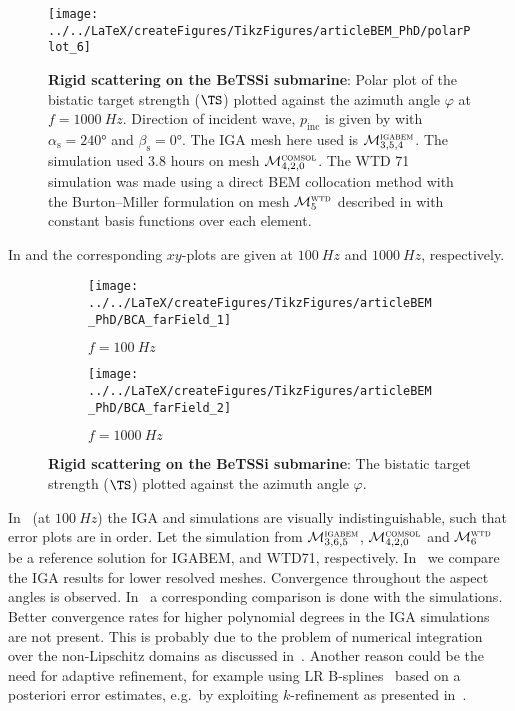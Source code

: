 \begin{figure}
	\centering
	\texttt{[image: ../../LaTeX/createFigures/TikzFigures/articleBEM\_PhD/polarPlot\_6]}
	\caption{\textbf{Rigid scattering on the BeTSSi submarine}: Polar plot of the bistatic target strength ($\TS$) plotted against the azimuth angle $\varphi$ at $f=\SI{1000}{Hz}$. Direction of incident wave, $p_{\mathrm{inc}}$ is given by  with $\alpha_{\mathrm{s}}=\ang{240}$ and $\beta_{\mathrm{s}}=\ang{0}$. The IGA mesh here used is ${\cal M}_{3,5,4}^{\textsc{igabem}}$. The \COMSOL simulation used \num{3.8} hours on mesh ${\cal M}_{4,2,0}^{\textsc{comsol}}$. The WTD 71 simulation was made using a direct BEM collocation method with the Burton--Miller formulation on mesh ${\cal M}_{5}^{\textsc{wtd}}$ described in  with constant basis functions over each element.}
	\label{Eq3:polar_BI}
\end{figure}
In  and  the corresponding $xy$-plots are given at $\SI{100}{Hz}$ and $\SI{1000}{Hz}$, respectively.
\begin{figure}
	\centering
	\begin{subfigure}[t]{\textwidth}
		\texttt{[image: ../../LaTeX/createFigures/TikzFigures/articleBEM\_PhD/BCA\_farField\_1]}
		\caption{$f=\SI{100}{Hz}$}
		\label{Fig3:xy_BI_100}
	\end{subfigure} 
	\par\bigskip
	\par\bigskip
	\begin{subfigure}[t]{\textwidth}
		\texttt{[image: ../../LaTeX/createFigures/TikzFigures/articleBEM\_PhD/BCA\_farField\_2]}
		\caption{$f=\SI{1000}{Hz}$}
		\label{Fig3:xy_BI_1000}
	\end{subfigure} 
	\caption{\textbf{Rigid scattering on the BeTSSi submarine}: The bistatic target strength ($\TS$) plotted against the azimuth angle $\varphi$.}
\end{figure}
In~ (at $\SI{100}{Hz}$) the IGA and \COMSOL simulations are visually indistinguishable, such that error plots are in order. Let the simulation from ${\cal M}_{3,6,5}^{\textsc{igabem}}$, ${\cal M}_{4,2,0}^{\textsc{comsol}}$ and ${\cal M}_{6}^{\textsc{wtd}}$ be a reference solution for IGABEM, \COMSOL and WTD71, respectively. In~ we compare the IGA results for lower resolved meshes. Convergence throughout the aspect angles is observed. In~ a corresponding comparison is done with the \COMSOL simulations. Better convergence rates for higher polynomial degrees in the IGA simulations are not present. This is probably due to the problem of numerical integration over the non-Lipschitz domains as discussed in~. Another reason could be the need for adaptive refinement, for example using LR B-splines~\cite{Johannessen2014iau} based on a posteriori error estimates, e.g.\ by exploiting $k$-refinement as presented in~\cite{Kumar2015sap}.
